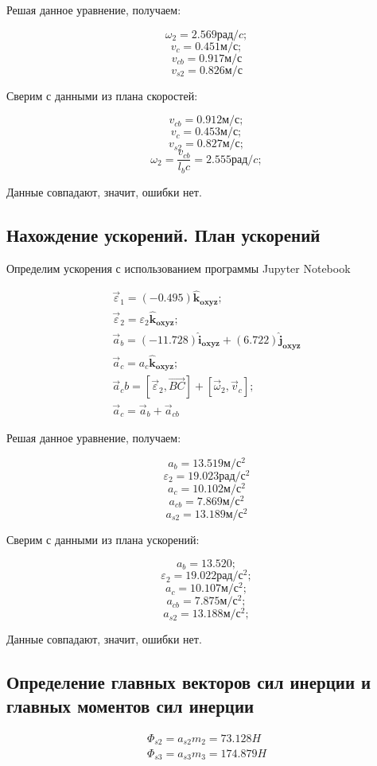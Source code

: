 Решая данное уравнение, получаем:

	$$\omega_2 = 2.569 рад/c;$$
	$$v_c = 0.451 м/с;$$
	$$v_{cb} = 0.917 м/с$$
	$$v_{s2} = 0.826 м/с$$

Сверим с данными из плана скоростей:

	$$v_{cb} = 0.912 м/с;$$
	$$v_{c} = 0.453 м/с;$$
	$$v_{s2} = 0.827 м/с;$$
	$$\omega_2 = \dfrac{v_{cb}}{l_bc} = 2.555 рад/c;$$

Данные совпадают, значит, ошибки нет.

\subsection{Нахождение ускорений. План ускорений}

Определим ускорения с использованием программы Jupyter Notebook

\begin{eqnarray}
	\vec \varepsilon_1 = (-0.495)\mathbf{\hat{k}_{oxyz}}; \\
	\vec \varepsilon_2 = \varepsilon_2\mathbf{\hat{k}_{oxyz}}; \\
	\vec a_b = (-11.728)\mathbf{\hat{i}_{oxyz}} + (6.722)\mathbf{\hat{j}_{oxyz}} \\
	\vec a_c = a_c \mathbf{\hat{k}_{oxyz}}; \\
	\vec a_cb = [\vec \varepsilon_2, \vec {BC}] + [\vec \omega_2, \vec v_c]; \\
	\vec a_c = \vec a_b + \vec a_{cb}
\end{eqnarray}

Решая данное уравнение, получаем:

	$$a_b = 13.519 м/с^2$$ 
	$$\varepsilon_2 = 19.023 рад/с^2$$
	$$a_c = 10.102 м/с^2$$ 
	$$a_{cb} = 7.869 м/с^2$$ 
	$$a_{s2} = 13.189 м/с^2$$ 

Сверим с данными из плана ускорений:

$$a_b = 13.520; $$
$$\varepsilon_2 = 19.022 рад/с^2; $$
$$a_c = 10.107 м/с^2; $$
$$a_{cb} = 7.875 м/с^2; $$
$$a_{s2} = 13.188 м/с^2; $$

Данные совпадают, значит, ошибки нет.

\subsection{Определение главных векторов сил инерции и главных моментов сил инерции}

\begin{eqnarray}
	\Phi_{s2} = a_{s2} m_2 = 73.128 H \\
	\Phi_{s3} = a_{s3} m_3 = 174.879 H 
\end{eqnarray}

